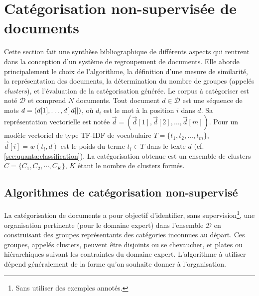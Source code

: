 
\section{Catégorisation non-supervisée de documents}
\label{sec:similarite:biblio}

Cette section fait une synthèse bibliographique de différents aspects qui rentrent dans la conception d'un système de regroupement de documents. Elle aborde principalement le choix de l'algorithme, la définition d'une mesure de similarité, la représentation des documents, la détermination du nombre de groupes (appelés \textit{clusters}), et l'évaluation de la catégorisation générée. Le corpus à catégoriser est noté $\mathcal{D}$ et comprend $N$ documents. Tout document $d \in \mathcal{D}$ est une séquence de mots $d=(d[1], \dots, d[{\vert d\vert}])$, où $d_i$ est le mot à la position $i$ dans $d$. Sa représentation vectorielle  est notée $\vec{d}=(\vec{d}[1], \vec{d}[2], \dots, \vec{d}[m])$. Pour un modèle vectoriel de type TF-IDF de vocabulaire $T = \lbrace t_1, t_2, \dots, t_m \rbrace$, $\vec{d}[i] = w(t_i,d)$ est le poids du terme $t_i \in T$ dans le texte $d$ ({cf. \ref{sec:quanta:classification}}). La catégorisation obtenue est un ensemble de clusters $C = \lbrace C_1, C_2, \cdots, C_K \rbrace$, $K$ étant le nombre de clusters formés.

\subsection{Algorithmes de catégorisation non-supervisé}

La catégorisation de documents a pour objectif  d'identifier, sans supervision\footnote{Sans utiliser des exemples annotés.}, une organisation pertinente (pour le domaine expert) dans l'ensemble $\mathcal{D}$ en construisant des groupes représentants des catégories inconnues au départ. Ces groupes, appelés clusters, peuvent être disjoints ou se chevaucher, et plates ou hiérarchiques suivant les contraintes du domaine expert. L’algorithme à utiliser dépend généralement de la forme qu’on souhaite donner à l’organisation. 

